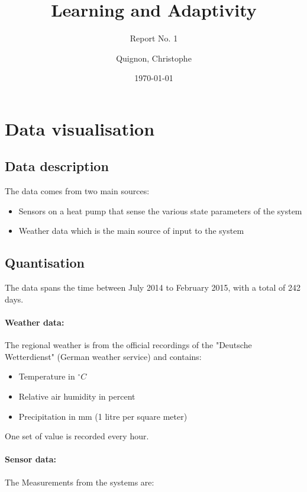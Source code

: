 \documentclass{scrartcl}
\begin{document}
\title{Learning and Adaptivity}
\subtitle{Report No. 1}
\author{
  Quignon, Christophe
}
\date{\today}


\maketitle


\section{Data visualisation}
\subsection{Data description}
The data comes from two main sources:
\begin{itemize}
\item Sensors on a heat pump that sense the various state parameters of the system
\item Weather data which is the main source of input to the system
\end{itemize}


\subsection{Quantisation}
The data spans the time between July 2014 to February 2015, with a total of 242 days.

\paragraph{Weather data:}
The regional weather is from the official recordings of the "Deutsche Wetterdienst" (German weather service) and contains:

\begin{itemize}
\item Temperature in $^\circ C$
\item Relative air humidity in percent
\item Precipitation in mm (1 litre per square meter)
\end{itemize}

One set of value is recorded every hour.

\paragraph{Sensor data:}
The Measurements from the systems are:
\end{document}

